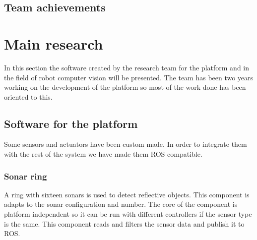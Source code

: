 %
\subsection{Team achievements}



%
\section{Main research}
In this section the software created by the research team for the platform and in the field of robot computer vision will be presented.
The team has been two years working on the development of the platform so most of the work done has been oriented to this.

\subsection{Software for the platform}
Some sensors and actuators have been custom made.
In order to integrate them with the rest of the system we have made them ROS compatible.
\subsubsection{Sonar ring}
A ring with sixteen sonars is used to detect reflective objects.
This component is adapts to the sonar configuration and number.
The core of the component is platform independent so it can be run with different controllers if the sensor type is the same.
This component reads and filters the sensor data and publish it to ROS.

